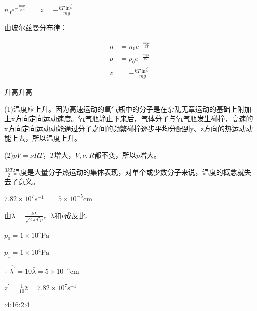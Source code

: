 \exercise
$
n _ { 0 } e ^ { - \frac { m g z } { k T } }
\qquad
z = - \frac { k T \ln ^ { \frac { p } { p_0 } } } { m g }
$

\solve 由玻尔兹曼分布律：

$$
\begin{aligned} n & = n _ { 0 } e ^ { - \frac { m g z } { k T } } \\ p & = p _ { 0 } e ^ { - \frac { m g z } { k T } } \\ z & = - \frac { k T \ln ^ { \frac { p } { p _ { 0 } } } } { m g } \end{aligned}
$$

\exercise 升高\qquad 升高

\solve (1)温度应上升。因为高速运动的氧气瓶中的分子是在杂乱无章运动的基础上附加上x方向定向运动速度。氧气瓶静止下来后，气体分子与氧气瓶发生碰撞，高速的x方向定向运动动能通过分子之间的频繁碰撞逐步平均分配到y、z方向的热运动动能上去，所以温度上升。

(2)$pV=\nu RT$，$T$增大，$V,\nu,R$都不变，所以$p$增大。

\exercise $\frac{3kT}{2}$\qquad 温度是大量分子热运动的集体表现，对单个或少数分子来说，温度的概念就失去了意义。

\exercise $7.82 \times 10 ^ { 7 } s ^ { - 1 } \qquad5 \times 10 ^ { - 5 } \mathrm { cm }$

\solve
由$\bar { \lambda } = \frac { k T } { \sqrt { 2 } \pi d^2p }$，$\bar { \lambda } $和$\bar { v } $成反比.

$p _0= 1 \times 10 ^ { 5 }\mathrm{Pa}$

$p _1= 1 \times 10 ^ { 4 }\mathrm{Pa}$

${ \therefore\ \overline{\lambda^{\prime} } = 10 \bar { \lambda } = 5 \times 10 ^ { - 5 }\mathrm{ cm }}$

${ z ^{\prime } = \frac { 1 } { 10 } \bar { z } = 7.82 \times 10 ^ { 7 }\mathrm{s^{-1}}}$

:4:16:2:4

\solve

